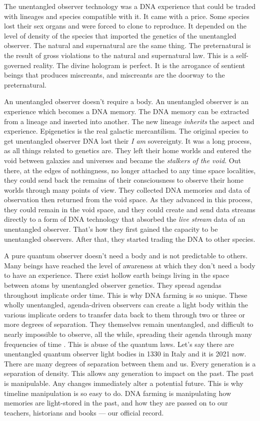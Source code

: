 The unentangled observer technology was a DNA experience that could be
traded with lineages and species compatible with it. It came with a
price. Some species lost their sex organs and were forced to clone to
reproduce. It depended on the level of density of the species that
imported the genetics of the unentangled observer. The natural and
supernatural are the same thing. The preternatural is the result of
gross violations to the natural and supernatural law. This is a
self-governed reality. The divine hologram is perfect. It is the
arrogance of sentient beings that produces miscreants, and miscreants
are the doorway to the preternatural.

An unentangled observer doesn't require a body. An unentangled observer
is an experience which becomes a DNA memory. The DNA memory can be
extracted from a lineage and inserted into another. The new lineage
\emph{inherits} the aspect and experience. Epigenetics is the real
galactic mercantilism. The original species to get unentangled observer
DNA lost their \emph{I am} sovereignty. It was a long process, as all
things related to genetics are. They left their home worlds and entered
the void between galaxies and universes and became the \emph{stalkers of
the void}. Out there, at the edges of nothingness, no longer attached to
any time space localities, they could send back the remains of their
consciousness to observe their home worlds through many points of view.
They collected DNA memories and data of observation then returned from
the void space. As they advanced in this process, they could remain in
the void space, and they could create and send data streams directly to
a form of DNA technology that absorbed the \emph{live stream} data of an
unentangled observer. That's how they first gained the capacity to be
unentangled observers. After that, they started trading the DNA to other
species.

A pure quantum observer doesn't need a body and is not predictable to
others. Many beings have reached the level of awareness at which they
don't need a body to have an experience. There exist hollow earth beings
living in the space between atoms by unentangled observer genetics. They
spread agendas throughout implicate order time. This is why DNA farming
is so unique. These wholly unentangled, agenda-driven observers can
create a light body within the various implicate orders to transfer data
back to them through two or three or more degrees of separation. They
themselves remain unentangled, and difficult to nearly impossible to
observe, all the while, spreading their agenda through many frequencies
of time . This is abuse of the quantum laws. Let's say there are
unentangled quantum observer light bodies in 1330 in Italy and it is
2021 now. There are many degrees of separation between them and us.
Every generation is a separation of density. This allows any generation
to impact on the past. The past is manipulable. Any changes immediately
alter a potential future. This is why timeline manipulation is so easy
to do. DNA farming is manipulating how memories are light-stored in the
past, and how they are passed on to our teachers, historians and books
--- our official record.

